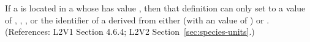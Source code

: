 If a \Species is located in a \Compartment whose 
has value , then that \Species definition can only set
 to a value of , ,
, or the identifier of a \UnitDefinition derived from
either  (with an  value of ) or
.  (References: L2V1 Section 4.6.4; L2V2
Section~\ref{sec:species-units}.)
